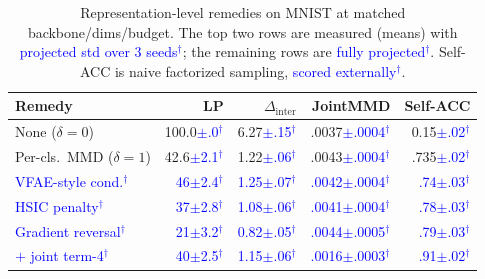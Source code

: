\documentclass[letterpaper]{article} %
\newcommand{\pj}[1]{\textcolor{blue}{#1$^{\dagger}$}}
\newcommand{\Dinter}{\Delta_{\mathrm{inter}}}
\begin{document}
\begin{table}[t]
\centering
\small
\setlength{\tabcolsep}{3.5pt}
\caption{Representation-level remedies on MNIST at matched
backbone/dims/budget. The top two rows are measured (means) with
\pj{projected std over 3 seeds}; the remaining rows are
\pj{fully projected}. Self-ACC is naive factorized sampling,
\pj{scored externally}.}
\label{tab:invariance}
\scriptsize
\setlength{\tabcolsep}{2.5pt}
\begin{tabular}{lrrrr}
\toprule
Remedy & LP & $\Dinter$ & JointMMD & Self-ACC \\
\midrule
None ($\delta{=}0$) & 100.0\pj{$\pm$.0} & 6.27\pj{$\pm$.15} & .0037\pj{$\pm$.0004} & 0.15\pj{$\pm$.02} \\
\midrule
Per-cls.\ MMD ($\delta{=}1$) & 42.6\pj{$\pm$2.1} & 1.22\pj{$\pm$.06} & .0043\pj{$\pm$.0004} & .735\pj{$\pm$.02} \\
\pj{VFAE-style cond.} & \pj{46$\pm$2.4} & \pj{1.25$\pm$.07} & \pj{.0042$\pm$.0004} & \pj{.74$\pm$.03} \\
\pj{HSIC penalty} & \pj{37$\pm$2.8} & \pj{1.08$\pm$.06} & \pj{.0041$\pm$.0004} & \pj{.78$\pm$.03} \\
\pj{Gradient reversal} & \pj{21$\pm$3.2} & \pj{0.82$\pm$.05} & \pj{.0044$\pm$.0005} & \pj{.79$\pm$.03} \\
\midrule
\pj{$+$ joint term-4} & \pj{40$\pm$2.5} & \pj{1.15$\pm$.06} & \pj{.0016$\pm$.0003} & \pj{.91$\pm$.02} \\
\bottomrule
\end{tabular}
\end{table}
\end{document}
